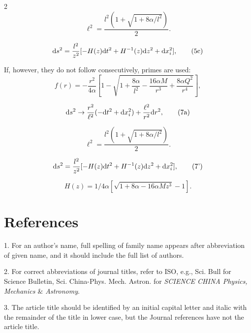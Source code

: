\documentclass[fleqn]{2026SCGE}
\begin{document}
\begin{multicols}{2}
\begin{equation}
	\ell^2=\frac{l^2(1+\sqrt{1+8\alpha/l^2})}{2}.\label{metric} \tag {5b}
\end{equation}

\begin{equation}
	\textmd{d}s^{2}=\frac{l^2}{z^2}[-H(z)\textmd{d}t^{2}+H^{-1}(z)\textmd{d}z^{2}+\textmd{d}x_i^2], \tag {5c}
\end{equation}



If, however, they do not follow consecutively, primes are used:
\begin{equation}
	f(r)=-\frac{r^2}{4\alpha}\left[1-\sqrt{1+\frac{8\alpha}{l^2}-\frac{16\alpha  M}{r^3}+\frac{8\alpha Q^2}{r^4}}\right], \tag {6}
\end{equation}

\begin{equation}
	\textmd{d}s^2\rightarrow \frac{r^2}{\ell^2}(-\textmd{d}t^2+\textmd{d}x_i^2)+\frac{\ell^2}{r^2}\textmd{d}r^2, \tag {7a}
\end{equation}

\begin{equation}
	\ell^2=\frac{l^2(1+\sqrt{1+8\alpha/l^2})}{2}.\label{metric} \tag {7b}
\end{equation}

\begin{equation}
	\textmd{d}s^{2}=\frac{l^2}{z^2}[-H(z)\textmd{d}t^{2}+H^{-1}(z)\textmd{d}z^{2}+\textmd{d}x_i^2], \tag {7'}
\end{equation}

\begin{equation}
	H(z)={1/4\alpha}\left[\sqrt{1+8\alpha-16\alpha M z^3 }-1\right]. \tag {7''}
\end{equation}


\section{References}\label{sec:8}
1. For an author's name, full spelling of family name appears after abbreviation of given name, and it should include the full list of authors.

2. For correct abbreviations of journal titles, refer to ISO, e.g., Sci. Bull for Science Bulletin, Sci. China-Phys. Mech. Astron. for \textit{SCIENCE CHINA Physics, Mechanics $ \& $ Astronomy}.

3. The article title should be identified by an initial capital letter and italic with the remainder of the title in lower case, but the Journal references have not the article title.


\end{multicols}
\end{document}
